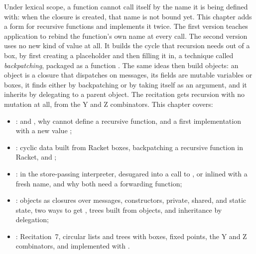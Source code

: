 Under lexical scope, a function cannot call itself by the name it is being defined with: when the closure is created, that name is not bound yet. This chapter adds a form  for recursive functions and implements it twice. The first version teaches application to rebind the function's own name at every call. The second version uses no new kind of value at all. It builds the cycle that recursion needs out of a box, by first creating a placeholder and then filling it in, a technique called \emph{backpatching}, packaged as a function . The same ideas then build objects: an object is a closure that dispatches on messages, its fields are mutable variables or boxes, it finds  either by backpatching or by taking itself as an argument, and it inherits by delegating to a parent object. The recitation gets recursion with no mutation at all, from the Y and Z combinators. This chapter covers:
\begin{itemize}
  \item {}:  and , why  cannot define a recursive function, and a first implementation with a new value ;
  \item {}: cyclic data built from Racket boxes, backpatching a recursive function in Racket, and ;
  \item {}:  in the store-passing interpreter, desugared into a call to , or inlined with a fresh name, and why both need a forwarding function;
  \item {}: objects as closures over messages, constructors, private, shared, and static state, two ways to get , trees built from objects, and inheritance by delegation;
  \item {}: Recitation~7, circular lists and trees with boxes, fixed points, the Y and Z combinators, and  implemented with .
\end{itemize}






